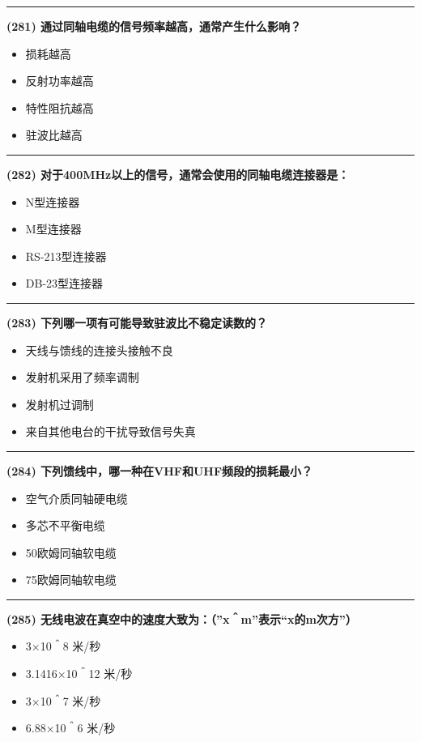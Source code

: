 \documentclass[twocolumn]{ctexart}  %
\begin{document}
\noindent\rule{0.5\textwidth}{1pt}
\heiti \textbf{(281) 通过同轴电缆的信号频率越高，通常产生什么影响？} \songti {\color{gray} [LK1221] }
\begin{itemize}
	\item  损耗越高
	\item  反射功率越高
	\item  特性阻抗越高
	\item  驻波比越高
\end{itemize}


\noindent\rule{0.5\textwidth}{1pt}
\heiti \textbf{(282) 对于400MHz以上的信号，通常会使用的同轴电缆连接器是：} \songti {\color{gray} [LK1222] }
\begin{itemize}
	\item  N型连接器
	\item  M型连接器
	\item  RS-213型连接器
	\item  DB-23型连接器
\end{itemize}


\noindent\rule{0.5\textwidth}{1pt}
\heiti \textbf{(283) 下列哪一项有可能导致驻波比不稳定读数的？} \songti {\color{gray} [LK1223] }
\begin{itemize}
	\item  天线与馈线的连接头接触不良
	\item  发射机采用了频率调制
	\item  发射机过调制
	\item  来自其他电台的干扰导致信号失真
\end{itemize}


\noindent\rule{0.5\textwidth}{1pt}
\heiti \textbf{(284) 下列馈线中，哪一种在VHF和UHF频段的损耗最小？} \songti {\color{gray} [LK1224] }
\begin{itemize}
	\item  空气介质同轴硬电缆
	\item  多芯不平衡电缆
	\item  50欧姆同轴软电缆
	\item  75欧姆同轴软电缆
\end{itemize}


\noindent\rule{0.5\textwidth}{1pt}
\heiti \textbf{(285) 无线电波在真空中的速度大致为：（”x＾m”表示“x的m次方”）} \songti {\color{gray} [LK0972] }
\begin{itemize}
	\item  3×10＾8 米/秒
	\item  3.1416×10＾12 米/秒
	\item  3×10＾7 米/秒
	\item  6.88×10＾6 米/秒
\end{itemize}
\end{document}

